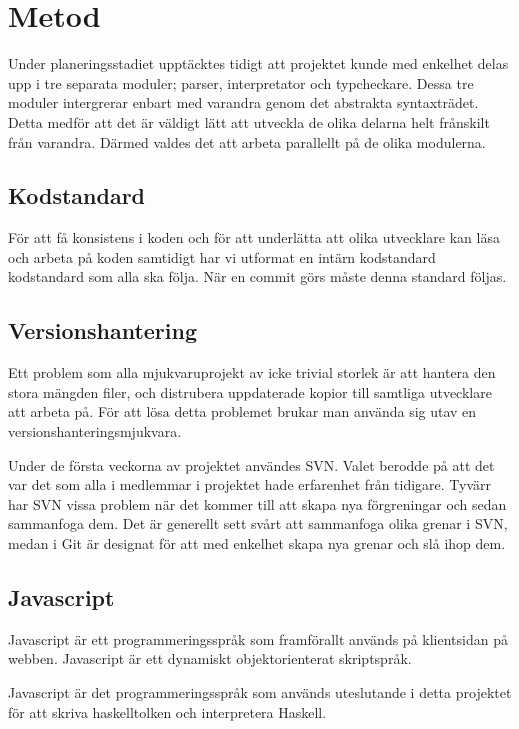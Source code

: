 \section{Metod} 

Under planeringsstadiet upptäcktes tidigt att projektet kunde med enkelhet delas upp i tre separata moduler; parser, interpretator och typcheckare. Dessa tre moduler intergrerar enbart med varandra genom det abstrakta syntaxträdet. Detta medför att det är väldigt lätt att utveckla de olika delarna helt frånskilt från varandra. Därmed valdes det att arbeta parallellt på de olika modulerna.

\subsection{Kodstandard} 
För att få konsistens i koden och för att underlätta att olika utvecklare kan läsa och arbeta på koden samtidigt har vi utformat en intärn kodstandard kodstandard som alla ska följa.
När en commit görs måste denna standard följas.

\subsection{Versionshantering} 
Ett problem som alla mjukvaruprojekt av icke trivial storlek är att hantera den stora mängden filer, och distrubera uppdaterade kopior till samtliga utvecklare att arbeta på.
För att lösa detta problemet brukar man använda sig utav en versionshanteringsmjukvara. 

Under de första veckorna av projektet användes SVN. Valet berodde på att det var det som alla i medlemmar i projektet hade erfarenhet från tidigare. Tyvärr har SVN vissa problem när det kommer till att skapa nya förgreningar och sedan sammanfoga dem. Det är generellt sett svårt att sammanfoga olika grenar i SVN, medan i Git är designat för att med enkelhet skapa nya grenar och slå ihop dem.

\subsection{Javascript} 
Javascript \citep{javascript} är ett programmeringsspråk som framförallt används på klientsidan på webben. Javascript är ett dynamiskt objektorienterat skriptspråk.

Javascript är det programmeringsspråk som används uteslutande i detta projektet för att skriva haskelltolken och interpretera Haskell.

